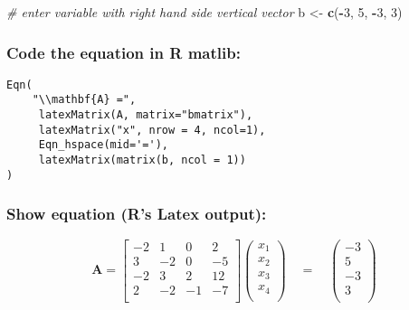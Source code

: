 \documentclass[
  10pt,
  a4paper,
]{article}
\newenvironment{Shaded}{\begin{snugshade}}{\end{snugshade}}
\newcommand{\CommentTok}[1]{\textcolor[rgb]{0.56,0.35,0.01}{\textit{#1}}}
\newcommand{\DecValTok}[1]{\textcolor[rgb]{0.00,0.00,0.81}{#1}}
\newcommand{\FunctionTok}[1]{\textcolor[rgb]{0.13,0.29,0.53}{\textbf{#1}}}
\newcommand{\NormalTok}[1]{#1}
\newcommand{\OtherTok}[1]{\textcolor[rgb]{0.56,0.35,0.01}{#1}}
\newcommand{\SpecialCharTok}[1]{\textcolor[rgb]{0.81,0.36,0.00}{\textbf{#1}}}
\begin{document}
\begin{Shaded}
\begin{Highlighting}[]
\CommentTok{\# enter variable with right hand side vertical vector}
\NormalTok{b }\OtherTok{\textless{}{-}} \FunctionTok{c}\NormalTok{(}\SpecialCharTok{{-}}\DecValTok{3}\NormalTok{, }\DecValTok{5}\NormalTok{, }\SpecialCharTok{{-}}\DecValTok{3}\NormalTok{, }\DecValTok{3}\NormalTok{)}
\end{Highlighting}
\end{Shaded}

\hypertarget{code-the-equation-in-r-matlib}{%
\subsubsection{Code the equation in R
matlib:}\label{code-the-equation-in-r-matlib}}

\begin{verbatim}
Eqn(
    "\\mathbf{A} =",
     latexMatrix(A, matrix="bmatrix"),
     latexMatrix("x", nrow = 4, ncol=1),
     Eqn_hspace(mid='='), 
     latexMatrix(matrix(b, ncol = 1))
)
\end{verbatim}

\hypertarget{show-equation-rs-latex-output}{%
\subsubsection{Show equation (R's Latex
output):}\label{show-equation-rs-latex-output}}

\begin{equation*}
\mathbf{A} =\begin{bmatrix} 
-2 &  1 &  0 &  2 \\ 
 3 & -2 &  0 & -5 \\ 
-2 &  3 &  2 & 12 \\ 
 2 & -2 & -1 & -7 \\ 
\end{bmatrix}
\begin{pmatrix} 
  x_{1} \\ 
  x_{2} \\ 
  x_{3} \\ 
  x_{4} \\ 
\end{pmatrix}
\quad=\quad\begin{pmatrix} 
-3 \\ 
 5 \\ 
-3 \\ 
 3 \\ 
\end{pmatrix}
\end{equation*}
\end{document}
